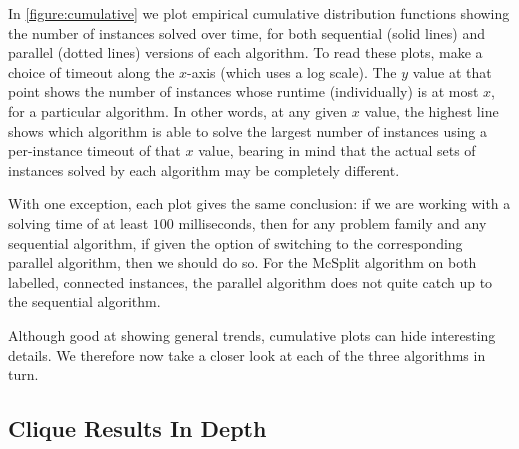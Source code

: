 \documentclass{llncs}
\begin{document}
In \cref{figure:cumulative} we plot empirical cumulative distribution functions showing the number
of instances solved over time, for both sequential (solid lines) and parallel (dotted lines)
versions of each algorithm. To read these plots, make a choice of timeout along the $x$-axis (which
uses a log scale). The $y$ value at that point shows the number of instances whose runtime
(individually) is at most $x$, for a particular algorithm. In other words, at any given $x$ value,
the highest line shows which algorithm is able to solve the largest number of instances using a
per-instance timeout of that $x$ value, bearing in mind that the actual sets of instances solved by
each algorithm may be completely different.

With one exception, each plot gives the same conclusion: if we are working with a solving time of at
least $100$ milliseconds, then for any problem family and any sequential algorithm, if given the
option of switching to the corresponding parallel algorithm, then we should do so. For the McSplit
algorithm on both labelled, connected instances, the parallel algorithm does not quite catch up to
the sequential algorithm.

Although good at showing general trends, cumulative plots can hide interesting details. We therefore
now take a closer look at each of the three algorithms in turn.

\subsection{Clique Results In Depth}
\end{document}
